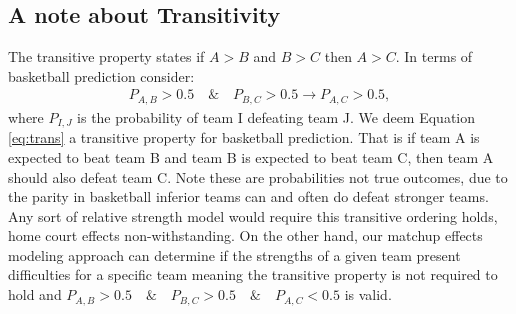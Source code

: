\subsection{A note about Transitivity}
The transitive property states if $A>B$ and $B>C$ then $A>C$. In terms of basketball prediction consider:
\begin{eqnarray}
P_{A,B} > 0.5 \quad \& \quad P_{B,C} > 0.5 \rightarrow P_{A,C} > 0.5,
\label{eq:trans}
\end{eqnarray}
where $P_{I,J}$ is the probability of team I defeating team J.  We deem Equation \ref{eq:trans} a transitive property for basketball prediction. That is if team A is expected to beat team B and team B is expected to beat team C, then team A should also defeat team C. Note these are probabilities not true outcomes, due to the parity in basketball inferior teams can and often do defeat stronger teams. Any sort of relative strength model would require this transitive ordering holds, home court effects non-withstanding. On the other hand, our matchup effects modeling approach can determine if the strengths of a given team present difficulties for a specific team meaning the transitive property is not required to hold and $P_{A,B} > 0.5 \quad \& \quad P_{B,C} > 0.5\quad \& \quad P_{A,C} < 0.5$ is valid.
